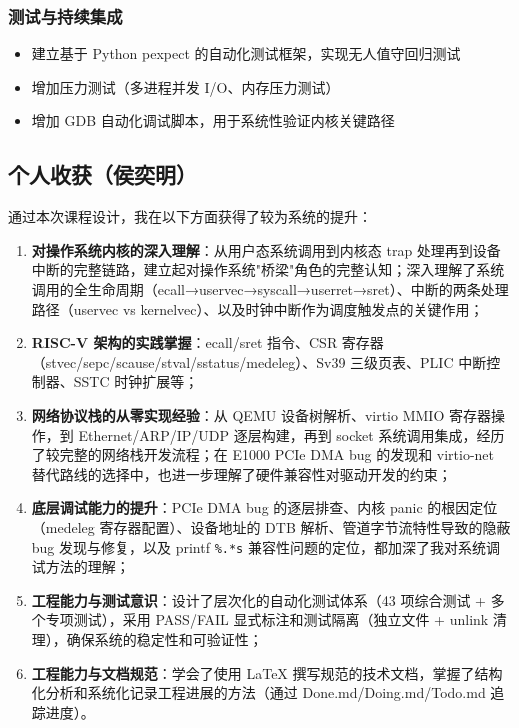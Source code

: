 \documentclass[12pt,a4paper]{ctexart}
\begin{document}
\subsubsection{测试与持续集成}
\begin{itemize}
  \item 建立基于 Python pexpect 的自动化测试框架，实现无人值守回归测试
  \item 增加压力测试（多进程并发 I/O、内存压力测试）
  \item 增加 GDB 自动化调试脚本，用于系统性验证内核关键路径
\end{itemize}

\subsection{个人收获（侯奕明）}

通过本次课程设计，我在以下方面获得了较为系统的提升：

\begin{enumerate}
  \item \textbf{对操作系统内核的深入理解}：从用户态系统调用到内核态 trap 处理再到设备中断的完整链路，建立起对操作系统"桥梁"角色的完整认知；深入理解了系统调用的全生命周期（ecall→uservec→syscall→userret→sret）、中断的两条处理路径（uservec vs kernelvec）、以及时钟中断作为调度触发点的关键作用；
  \item \textbf{RISC-V 架构的实践掌握}：ecall/sret 指令、CSR 寄存器（stvec/sepc/scause/stval/sstatus/medeleg）、Sv39 三级页表、PLIC 中断控制器、SSTC 时钟扩展等；
  \item \textbf{网络协议栈的从零实现经验}：从 QEMU 设备树解析、virtio MMIO 寄存器操作，到 Ethernet/ARP/IP/UDP 逐层构建，再到 socket 系统调用集成，经历了较完整的网络栈开发流程；在 E1000 PCIe DMA bug 的发现和 virtio-net 替代路线的选择中，也进一步理解了硬件兼容性对驱动开发的约束；
  \item \textbf{底层调试能力的提升}：PCIe DMA bug 的逐层排查、内核 panic 的根因定位（medeleg 寄存器配置）、设备地址的 DTB 解析、管道字节流特性导致的隐蔽 bug 发现与修复，以及 printf \texttt{\%.*s} 兼容性问题的定位，都加深了我对系统调试方法的理解；
  \item \textbf{工程能力与测试意识}：设计了层次化的自动化测试体系（43 项综合测试 + 多个专项测试），采用 PASS/FAIL 显式标注和测试隔离（独立文件 + unlink 清理），确保系统的稳定性和可验证性；
  \item \textbf{工程能力与文档规范}：学会了使用 LaTeX 撰写规范的技术文档，掌握了结构化分析和系统化记录工程进展的方法（通过 Done.md/Doing.md/Todo.md 追踪进度）。
\end{enumerate}
\end{document}
